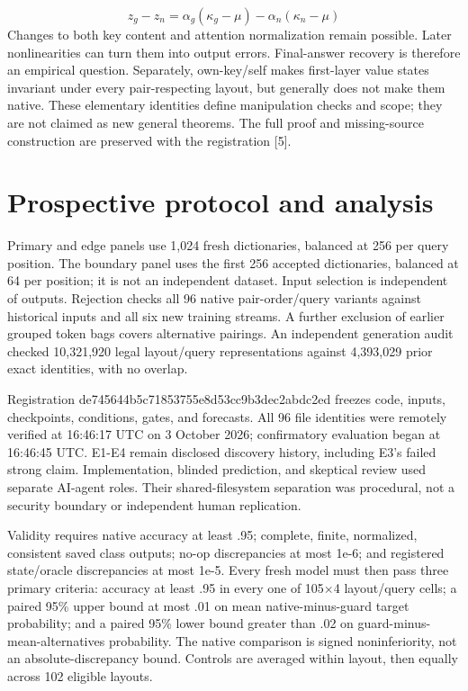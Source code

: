 \documentclass[10pt,letterpaper]{article}
\begin{document}
\begin{equation}
z_g-z_n=\alpha_g(\kappa_g-\mu)-\alpha_n(\kappa_n-\mu)
\end{equation}
Changes to both key content and attention normalization remain possible. Later nonlinearities can turn them into output errors. Final-answer recovery is therefore an empirical question. Separately, own-key/self makes first-layer value states invariant under every pair-respecting layout, but generally does not make them native. These elementary identities define manipulation checks and scope; they are not claimed as new general theorems. The full proof and missing-source construction are preserved with the registration [5].

\section{Prospective protocol and analysis}
Primary and edge panels use 1,024 fresh dictionaries, balanced at 256 per query position. The boundary panel uses the first 256 accepted dictionaries, balanced at 64 per position; it is not an independent dataset. Input selection is independent of outputs. Rejection checks all 96 native pair-order/query variants against historical inputs and all six new training streams. A further exclusion of earlier grouped token bags covers alternative pairings. An independent generation audit checked 10,321,920 legal layout/query representations against 4,393,029 prior exact identities, with no overlap.

Registration de745644b5c71853755e8d53cc9b3dec2abdc2ed freezes code, inputs, checkpoints, conditions, gates, and forecasts. All 96 file identities were remotely verified at 16:46:17 UTC on 3 October 2026; confirmatory evaluation began at 16:46:45 UTC. E1-E4 remain disclosed discovery history, including E3's failed strong claim. Implementation, blinded prediction, and skeptical review used separate AI-agent roles. Their shared-filesystem separation was procedural, not a security boundary or independent human replication.

Validity requires native accuracy at least .95; complete, finite, normalized, consistent saved class outputs; no-op discrepancies at most 1e-6; and registered state/oracle discrepancies at most 1e-5. Every fresh model must then pass three primary criteria: accuracy at least .95 in every one of 105\ensuremath{\times}4 layout/query cells; a paired 95\% upper bound at most .01 on mean native-minus-guard target probability; and a paired 95\% lower bound greater than .02 on guard-minus-mean-alternatives probability. The native comparison is signed noninferiority, not an absolute-discrepancy bound. Controls are averaged within layout, then equally across 102 eligible layouts.
\end{document}
